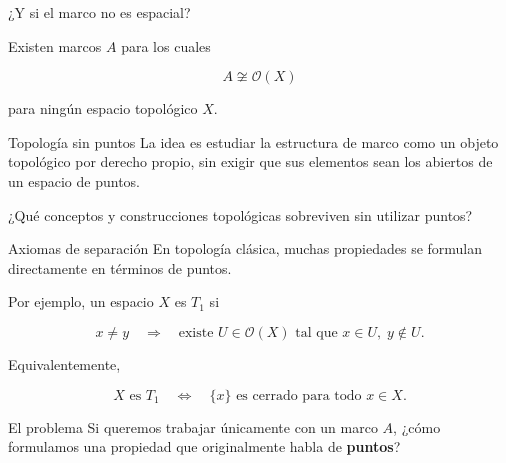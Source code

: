 \documentclass[compress,12pt]{beamer}
\begin{document}
\begin{frame}{¿Y si el marco no es espacial?}
\small{
Existen marcos $A$ para los cuales

\[
A \not\cong \mathcal O(X)
\]

para ningún espacio topológico $X$.

\pause

\bigskip

\begin{block}{Topología sin puntos}
La idea es estudiar la estructura de marco como un objeto
topológico por derecho propio, sin exigir que sus elementos
sean los abiertos de un espacio de puntos.
\end{block}

\pause

\vfill

\begin{center}
¿Qué conceptos y construcciones topológicas sobreviven
sin utilizar puntos?
\end{center}
}
\end{frame}

\begin{frame}{Axiomas de separación}
\small
En topología clásica, muchas propiedades se formulan
directamente en términos de puntos.

\medskip

Por ejemplo, un espacio $X$ es \textbf{$T_1$} si

\[
    x\neq y
    \quad\Longrightarrow\quad
    \text{existe } U\in\mathcal O(X)
    \text{ tal que }
    x\in U,\; y\notin U.
\]

\pause

\medskip

Equivalentemente,

\[
    X \text{ es } T_1
    \quad\Longleftrightarrow\quad
    \{x\} \text{ es cerrado para todo }x\in X.
\]

\pause

\vfill

\begin{block}{El problema}
\centering
Si queremos trabajar únicamente con un marco $A$,
¿cómo formulamos una propiedad que originalmente
habla de \textbf{puntos}?
\end{block}

\end{frame}
\end{document}
